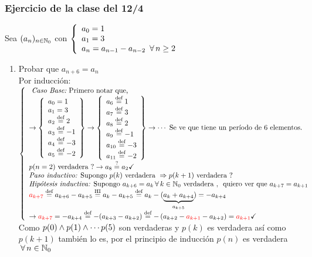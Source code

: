 \documentclass[12pt,a4paper, spanish]{article}
\begin{document}
\subsubsection*{Ejercicio de la clase del 12/4}
Sea $(a_n)_{n \en \naturales_0}$ con
$\llave{l}{
		a_0 = 1\\
		a_1 = 3\\
		a_n = a_{n-1} - a_{n-2}\ \paratodo n \geq 2
	}$
\begin{enumerate}[label=(\alph*)]
	\item Probar que $a_{n+6} = a_n$\\
	      Por inducción: \\
	      $\llave{l}{
		      \textit{ Caso Base:} \text{ Primero notar que,} \\
		      \to
		      \llaves{l}{
			      a_0 = 1\\
			      a_1 = 3\\
			      a_2 \eqDef= 2\\
			      a_3 \eqDef= -1\\
			      a_4 \eqDef= -3\\
			      a_5 \eqDef= -2
		      } \to
		      \llaves{l}{
			      a_6 \eqDef= 1\\
			      a_7 \eqDef= 3\\
			      a_8 \eqDef= 2\\
			      a_9 \eqDef= -1\\
			      a_{10} \eqDef= -3\\
			      a_{11} \eqDef= -2
		      } \to
		      \cdots \text{ Se ve que tiene un período de 6 elementos.}\\

		      p(n=2) \V? \to a_8 \eq?=a_2 \checkmark\\

		      \textit{Paso inductivo: } \text{Supongo } p(k) \V \entonces p(k+1) \V?\\
		      \textit{Hipótesis inductiva: } \text{Supongo } a_{k+6} = a_k \paratodo k \in \naturales_0 \V ,\, \qvq a_{k+7} = a_{k+1}\\
		      \red{$a_{k+7}$} \eqDef= a_{k+6} - a_{k+5} \stacktext{HI}{=} a_k - a_{k+5} \eqDef = a_k - (\underbrace{\textstyle a_k + a_{k+4}}_{a_{k+5}}) = -a_{k+4}\\
		      \to \red{$a_{k+7}$} = -a_{k+4} \eqDef= -(a_{k+3} - a_{k+2}) \eqDef = -\parentesis{ a_{k+2} - \red{$a_{k+1}$} - a_{k+2} } = \red{$a_{k+1}$}\checkmark
		      }\\
	      $\\
	      Como $p(0) \y p(1) \y \cdots p(5)$ son verdaderas y $p(k)$ es verdadera así como $p(k+1)$ también lo es, por el principio de inducción $p(n)$ es verdadera $\paratodo n \in \naturales_0$


\end{enumerate}
\end{document}
